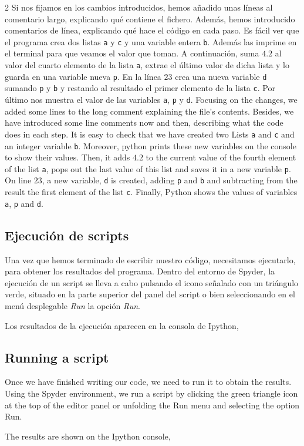 \begin{paracol}{2}
Si nos fijamos en los cambios introducidos, hemos añadido unas líneas al comentario largo, explicando qué contiene el fichero. Además, hemos introducido comentarios de línea, explicando qué hace el código en cada paso. Es fácil ver que el programa crea dos listas \texttt{a} y \texttt{c} y una variable entera \texttt{b}. Además las imprime en el terminal para que veamos el valor que toman. A continuación, suma $4.2$ al valor del cuarto elemento de la lista \texttt{a}, extrae el último valor de dicha lista y lo guarda en una variable nueva \texttt{p}. En la línea $23$ crea una nueva variable \texttt{d} sumando \texttt{p} y \texttt{b} y restando al resultado el primer elemento de la lista \texttt{c}. Por último nos muestra el valor de las variables \texttt{a}, \texttt{p} y \texttt{d}.
\switchcolumn
Focusing on the changes, we added some lines to the long comment explaining the file's contents. Besides, we have introduced some line comments now and then, describing what the code does in each step. It is easy to check that we have created two Lists \texttt{a} and \texttt{c} and an integer variable \texttt{b}. Moreover, python prints these new variables on the console to show their values. Then, it adds $4.2$ to the current value of the fourth element of the list \texttt{a}, pops out the last value of this list and saves it in a new variable \texttt{p}. On line $23$, a new variable, \texttt{d} is created, adding  \texttt{p} and \texttt{b} and subtracting from the result the first element of the list \texttt{c}. Finally, Python shows the values of variables \texttt{a}, \texttt{p} and \texttt{d}.

\switchcolumn
\subsection{Ejecución de scripts}
Una vez que hemos terminado de escribir nuestro código, necesitamos ejecutarlo, para obtener los resultados del programa. Dentro del entorno de Spyder, la ejecución de un script se lleva a cabo pulsando el icono señalado con un triángulo verde, situado en la parte superior del panel del script o bien seleccionando en el menú desplegable \emph{Run} la opción \emph{Run}.

Los resultados de la ejecución aparecen en la consola de Ipython,
\switchcolumn
\subsection{Running a script}
Once we have finished writing our code, we need to run it to obtain the results. Using the Spyder environment, we run a script by clicking the green triangle icon at the top of the editor panel or unfolding the Run menu and selecting the option Run.

The results are shown on the Ipython console,
\end{paracol}

